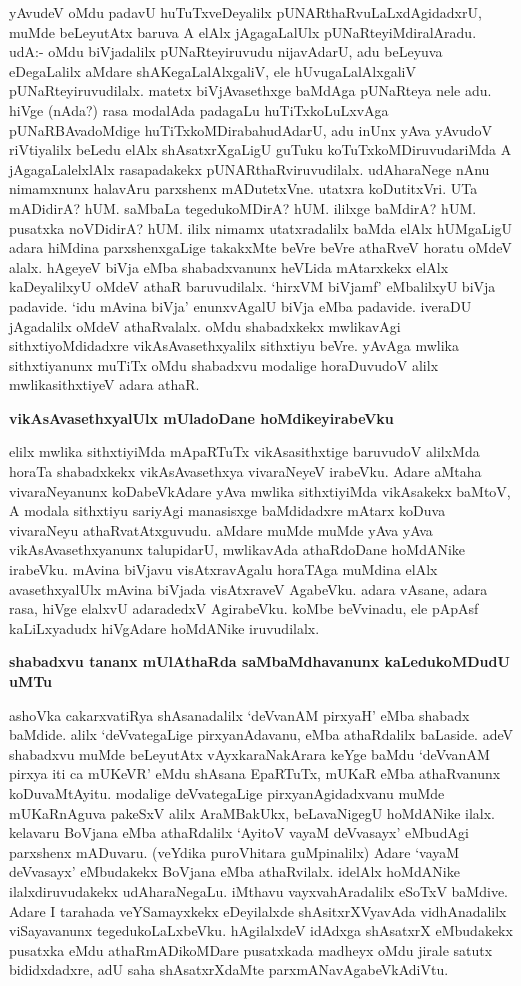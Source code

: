 \noindent
yAvudeV oMdu padavU huTuTxveDeyalilx pUNARthaRvuLaLxdAgidadxrU, muMde beLeyutAtx baruva A elAlx jAgagaLalUlx pUNaRteyiMdiralAradu. udA:- oMdu biVjadalilx pUNaRteyiruvudu nija\-vAdarU, adu beLeyuva eDegaLalilx aMdare shAKegaLalAlxgaliV, ele hUvugaLalAlxgaliV pUNaRteyiru\-vudilalx. matetx biVjAvasethxge baMdAga pUNaRteya nele adu. hiVge (nAda?) rasa modalAda pada\-gaLu huTiTx\-koLuLxvAga pUNaRBAvadoMdige huTiTxkoMDirabahudAdarU, adu inUnx yAva yAvudoV riVtiyalilx beLedu elAlx shAsatxrXgaLigU guTuku koTuTxkoMDiruvudariMda A jAgagaLalelxlAlx rasapadakekx pUNARthaRviruvudilalx. udAharaNege nAnu nimamxnunx halavAru parxshenx mADutetxVne. utatxra koDu\-titxVri. UTa mADidirA? hUM. saMbaLa tegedukoMDirA? hUM. ililxge baMdirA? hUM. pusatxka noVDidirA? hUM. ililx nimamx utatxradalilx baMda elAlx hUMgaLigU adara hiMdina parxshenxgaLige takakxMte beVre beVre athaRveV horatu oMdeV alalx. hAgeyeV biVja eMba shabadxvanunx heVLida mAtarxkekx elAlx kaDeyalilxyU oMdeV athaR baruvudilalx. `hirxVM biVjamf' eMbalilxyU biVja padavide. `idu mAvina\- biVja' enunxvAgalU biVja eMba padavide. iveraDU jAgadalilx oMdeV athaRvalalx. oMdu shabadxkekx mwlika\-vAgi sithxtiyoMdidadxre vikAsAvasethxyalilx sithxtiyu beVre. yAvAga mwlika sithxtiyanunx muTiTx oMdu shabadxvu modalige horaDuvudoV alilx mwlikasithxtiyeV adara athaR.

{\bigskip
\noindent
{\large\bf vikAsAvasethxyalUlx mUladoDane hoMdikeyirabeVku}}\label{page178}
\medskip

\noindent
elilx mwlika sithxtiyiMda mApaRTuTx vikAsasithxtige baruvudoV alilxMda horaTa shabadxkekx vikAsA\-vasethxya vivaraNeyeV irabeVku. Adare aMtaha vivaraNeyanunx koDabeVkAdare yAva mwlika sithxti\-yiMda vikAsakekx baMtoV, A modala sithxtiyu sariyAgi manasisxge baMdidadxre mAtarx koDuva vivara\-Neyu athaRvatAtxguvudu. aMdare muMde muMde yAva yAva vikAsAvasethxyanunx talupidarU, mwlika\-vAda athaRdoDane hoMdANike irabeVku. mAvina biVjavu visAtxravAgalu horaTAga muM\-dina elAlx avasethxyalUlx mAvina biVjada visAtxraveV AgabeVku. adara vAsane, adara rasa, hiVge elalxvU adaradedxV AgirabeVku. koMbe beVvinadu, ele pApAsf kaLiLxyadudx hiVgAdare hoMdANike iruvudilalx.

{\bigskip
\noindent
{\large\bf shabadxvu tananx mUlAthaRda saMbaMdhavanunx kaLedukoMDudU uMTu}}
\medskip

\noindent
ashoVka cakarxvatiRya shAsanadalilx `deVvanAM pirxyaH' eMba shabadx baMdide. alilx `deVvategaLige pirxya\-nAdavanu, eMba athaRdalilx baLaside. adeV shabadxvu muMde beLeyutAtx vAyxkaraNakArara keYge baMdu `deVvanAM pirxya iti ca mUKeVR' eMdu shAsana EpaRTuTx, mUKaR eMba athaRvanunx koDuvaMtA\-yitu. modalige deVvategaLige pirxyanAgidadxvanu muMde mUKaRnAguva pakeSxV alilx AraMBakUkx, beLa\-vaNigegU hoMdANike ilalx. kelavaru BoVjana eMba athaRdalilx `AyitoV vayaM deVvasayx' eMbu\-dAgi parxshenx mADuvaru. (veYdika puroVhitara guMpinalilx) Adare `vayaM deVvasayx' eMbudakekx BoVjana eMba athaRvilalx. idelAlx hoMdANike ilalxdiruvudakekx udAharaNegaLu. iMthavu vayxvahAradalilx eSoTxV baMdive. Adare I tarahada veYSamayxkekx eDeyilalxde shAsitxrXVyavAda vidhAnadalilx viSayavanunx tegedu\-koLaLxbeVku. hAgilalxdeV idAdxga shAsatxrX eMbudakekx pusatxka eMdu athaRmADikoMDare pusatxkada madheyx oMdu jirale satutx bididxdadxre, adU saha shAsatxrXdaMte parxmANavAgabeVkAdiVtu.

